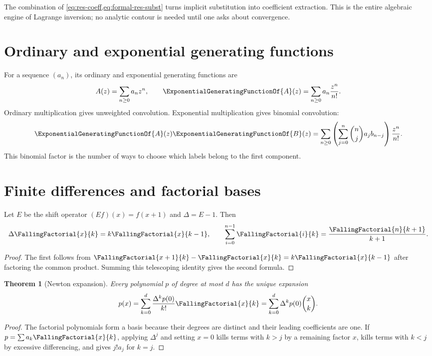 \documentclass[11pt,a4paper,oneside,openany]{book}
\newtheorem{theorem}{Theorem}[chapter]
\theoremstyle{definition}
\theoremstyle{remark}
\begin{document}
\begin{masterbox}
The combination of \cref{eq:res-coeff,eq:formal-res-subst} turns implicit
substitution into coefficient extraction.  This is the entire algebraic engine of
Lagrange inversion; no analytic contour is needed until one asks about convergence.
\end{masterbox}

\section{Ordinary and exponential generating functions}
For a sequence $(a_n)$, its ordinary and exponential generating functions are
\[
 A(z)=\sum_{n\ge0}a_nz^n,
 \qquad \ExponentialGeneratingFunctionOf{A}(z)=\sum_{n\ge0}a_n\frac{z^n}{n!}.
\]
Ordinary multiplication gives unweighted convolution.  Exponential multiplication
gives binomial convolution:
\begin{equation}\label{eq:egf-product}
 \ExponentialGeneratingFunctionOf{A}(z)\ExponentialGeneratingFunctionOf{B}(z)
 =\sum_{n\ge0}\left(\sum_{j=0}^n\binom nj a_jb_{n-j}\right)\frac{z^n}{n!}.
\end{equation}
This binomial factor is the number of ways to choose which labels belong to the
first component.

\section{Finite differences and factorial bases}
Let $E$ be the shift operator $(Ef)(x)=f(x+1)$ and
$\Delta=E-1$.  Then
\begin{equation}\label{eq:finite-diff-falling}
 \Delta\FallingFactorial{x}{k}=k\FallingFactorial{x}{k-1},
 \qquad
 \sum_{i=0}^{n-1}\FallingFactorial{i}{k}=\frac{\FallingFactorial{n}{k+1}}{k+1}.
\end{equation}
\begin{proof}
The first follows from
$\FallingFactorial{x+1}{k}-\FallingFactorial{x}{k}=k\FallingFactorial{x}{k-1}$ after factoring the common
product.  Summing this telescoping identity gives the second formula.
\end{proof}

\begin{theorem}[Newton expansion]\label{thm:newton-expansion}
Every polynomial $p$ of degree at most $d$ has the unique expansion
\begin{equation}\label{eq:newton-expansion}
 p(x)=\sum_{k=0}^d\frac{\Delta^kp(0)}{k!}\FallingFactorial{x}{k}
     =\sum_{k=0}^d\Delta^kp(0)\binom{x}{k}.
\end{equation}
\end{theorem}
\begin{proof}
The factorial polynomials form a basis because their degrees are distinct and their
leading coefficients are one.  If $p=\sum a_k\FallingFactorial{x}{k}$, applying $\Delta^j$
and setting $x=0$ kills terms with $k>j$ by a remaining factor $x$, kills terms
with $k<j$ by excessive differencing, and gives $j!a_j$ for $k=j$.
\end{proof}
\end{document}
